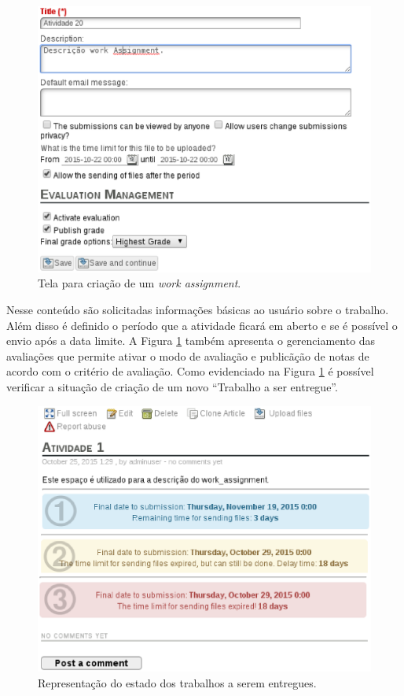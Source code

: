 \begin{figure}[h]
    \centering
    \includegraphics[keepaspectratio=true,scale=0.6]
      {figuras/work-assignment-final.eps}
    \caption{Tela para criação de um \textit{work assignment}.}
    \label{fig:work-assignment-final}
\end{figure}

Nesse conteúdo são solicitadas informações básicas ao usuário sobre o trabalho. Além disso é definido o período que a atividade ficará em aberto e se é possível o envio após a data limite. A Figura \ref{fig:work-assignment-final} também apresenta o gerenciamento das avaliações que permite ativar o modo de avaliação e publicãção de notas de acordo com o critério de avaliação. Como evidenciado na Figura \ref{fig:work-assignment-final} é possível verificar a situação de criação de um novo ``Trabalho a ser entregue''.

\begin{figure}[h]
    \centering
    \includegraphics[keepaspectratio=true,scale=0.6]
      {figuras/work-status.eps}
    \caption{Representação do estado dos trabalhos a serem entregues.}
    \label{fig:work-status}
\end{figure}

